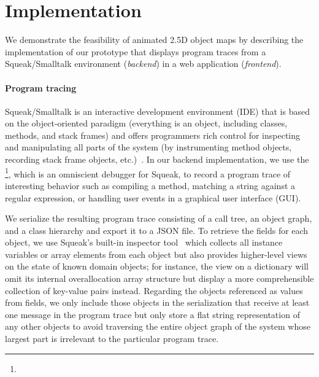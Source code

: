 \section{Implementation}
\label{sec:implementation}

We demonstrate the feasibility of animated 2.5D object maps by describing the implementation of our prototype \tfd{} that displays program traces from a Squeak/Smalltalk environment (\emph{backend}) in a web application (\emph{frontend}).

\paragraph{Program tracing}
\label{sec:implementation/program_tracing}

Squeak/Smalltalk is an interactive development environment (IDE) that is based on the object-oriented paradigm (everything is an object, including classes, methods, and stack frames) and offers programmers rich control for inspecting and manipulating all parts of the system (by instrumenting method objects, recording stack frame objects, etc.)~\cite{ingalls1997back,rowledge2001tour,thiede2023squeak}.
In our backend implementation, we use the \tdb{}\footnote{}, which is an omniscient debugger for Squeak, to record a program trace of interesting behavior such as compiling a method, matching a string against a regular expression, or handling user events in a graphical user interface (GUI).

We serialize the resulting program trace consisting of a call tree, an object graph, and a class hierarchy and export it to a JSON file.
To retrieve the fields for each object, we use Squeak's built-in inspector tool~\cite[chap. 6, sec. 3]{thiede2023squeak} which collects all instance variables or array elements from each object but also provides higher-level views on the state of known domain objects; for instance, the view on a dictionary will omit its internal overallocation array structure but display a more comprehensible collection of key-value pairs instead.
Regarding the objects referenced as values from fields, we only include those objects in the serialization that receive at least one message in the program trace but only store a flat string representation of any other objects to avoid traversing the entire object graph of the system whose largest part is irrelevant to the particular program trace.

